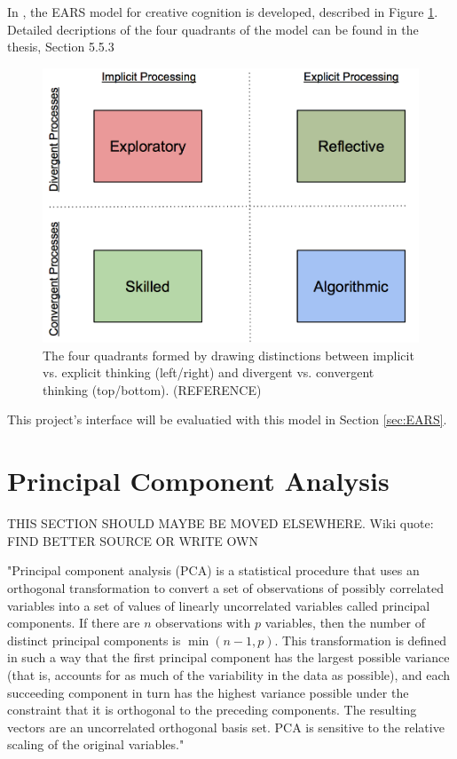 \documentclass[11pt, oneside]{report}   	%
\begin{document}
In \cite{TubbThesis}, the EARS model for creative cognition is developed, described in Figure \ref{fig:EARSmodel}. Detailed decriptions of the four quadrants of the model can be found in the thesis, Section 5.5.3
\begin{figure}[h] 
	\centering
	\includegraphics[width = 6in]{EARSmodel.png}
	\caption{The four quadrants formed by drawing distinctions between implicit vs. explicit thinking (left/right) and divergent vs. convergent thinking (top/bottom). (REFERENCE)}
	\label{fig:EARSmodel}
\end{figure}
This project's interface will be evaluatied with this model in Section \ref{sec:EARS}.

\section{Principal Component Analysis}
THIS SECTION SHOULD MAYBE BE MOVED ELSEWHERE.
Wiki quote: FIND BETTER SOURCE OR WRITE OWN

"Principal component analysis (PCA) is a statistical procedure that uses an orthogonal transformation to convert a set of observations of possibly correlated variables into a set of values of linearly uncorrelated variables called principal components. If there are $n$ observations with $p$ variables, then the number of distinct principal components is $\min(n−1, p)$. This transformation is defined in such a way that the first principal component has the largest possible variance (that is, accounts for as much of the variability in the data as possible), and each succeeding component in turn has the highest variance possible under the constraint that it is orthogonal to the preceding components. The resulting vectors are an uncorrelated orthogonal basis set. PCA is sensitive to the relative scaling of the original variables."
\end{document}
